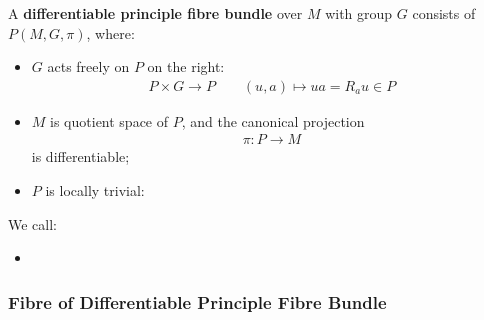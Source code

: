 \documentclass[Total.tex]{subfiles}
\begin{document}
				\begin{Def}
					A \textbf{differentiable principle fibre bundle} over $M$ with group $G$ consists of $P(M,G,\pi)$, where:
					
					\begin{itemize}
						\item $G$ acts freely on $P$ on the right:
						\begin{gather*}
							P\times G\rightarrow P\qquad(u,a)\mapsto ua=R_au\in P
						\end{gather*}
						\item $M$ is quotient space of $P$, and the canonical projection
						\begin{gather*}
							\pi:P\rightarrow M
						\end{gather*}
						is differentiable;
						
						\item $P$ is locally trivial:
					\end{itemize}
				\end{Def}
				
				We call:
				
				\begin{itemize}
					\item 
				\end{itemize}
				
				\subsubsection{Fibre of Differentiable Principle Fibre Bundle}
				
\end{document}
